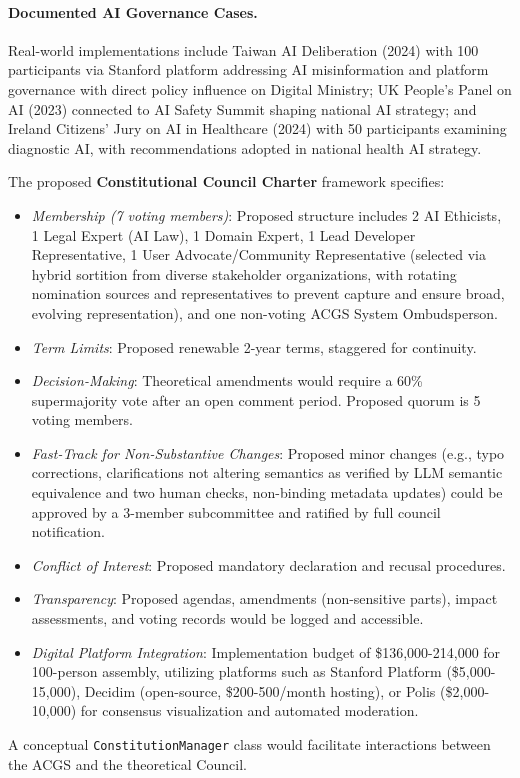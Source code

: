 \documentclass[manuscript,screen,9pt]{acmart}
\begin{document}
\paragraph{Documented AI Governance Cases.} Real-world implementations include Taiwan AI Deliberation (2024) with 100 participants via Stanford platform addressing AI misinformation and platform governance with direct policy influence on Digital Ministry; UK People's Panel on AI (2023) connected to AI Safety Summit shaping national AI strategy; and Ireland Citizens' Jury on AI in Healthcare (2024) with 50 participants examining diagnostic AI, with recommendations adopted in national health AI strategy.

The proposed \textbf{Constitutional Council Charter} framework specifies:
\begin{itemize}[leftmargin=*,itemsep=1pt,parsep=1pt]
    \item \textit{Membership (7 voting members)}: Proposed structure includes 2 AI Ethicists, 1 Legal Expert (AI Law), 1 Domain Expert, 1 Lead Developer Representative, 1 User Advocate/Community Representative (selected via hybrid sortition from diverse stakeholder organizations, with rotating nomination sources and representatives to prevent capture and ensure broad, evolving representation), and one non-voting ACGS System Ombudsperson.
    \item \textit{Term Limits}: Proposed renewable 2-year terms, staggered for continuity.
    \item \textit{Decision-Making}: Theoretical amendments would require a 60\% supermajority vote after an open comment period. Proposed quorum is 5 voting members.
    \item \textit{Fast-Track for Non-Substantive Changes}: Proposed minor changes (e.g., typo corrections, clarifications not altering semantics as verified by LLM semantic equivalence and two human checks, non-binding metadata updates) could be approved by a 3-member subcommittee and ratified by full council notification.
    \item \textit{Conflict of Interest}: Proposed mandatory declaration and recusal procedures.
    \item \textit{Transparency}: Proposed agendas, amendments (non-sensitive parts), impact assessments, and voting records would be logged and accessible.
    \item \textit{Digital Platform Integration}: Implementation budget of \$136,000-214,000 for 100-person assembly, utilizing platforms such as Stanford Platform (\$5,000-15,000), Decidim (open-source, \$200-500/month hosting), or Polis (\$2,000-10,000) for consensus visualization and automated moderation.
\end{itemize}
A conceptual \texttt{ConstitutionManager} class would facilitate interactions between the ACGS and the theoretical Council.
\end{document}
